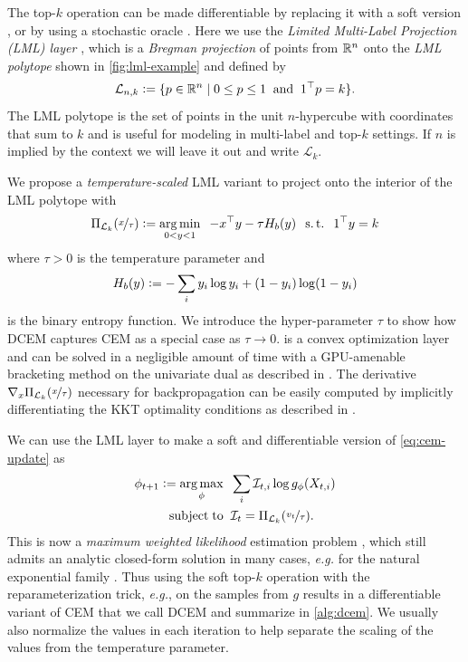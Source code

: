 \documentclass{article}
\newcommand{\eg}{{\it e.g.}\xspace}
\newcommand{\LML}{\ensuremath{\mathcal{L}}}
\begin{document}
The top-$k$ operation can be made differentiable by
replacing it with a soft version
\citep{martins2017learning,malaviya2018sparse,amos2019limited},
or by using a stochastic oracle \citep{brookes2018design}.
Here we use the
\emph{Limited Multi-Label Projection (LML) layer} \citep{amos2019limited},
which is a \emph{Bregman projection} of
points from ${\mathbb{R}}^n$ onto
the \emph{LML polytope}
shown in \cref{fig:lml-example} and defined by
\begin{equation}
  \LML_{n,k} \defeq \{p\in\sR^n \mid 0\leq p\leq 1 \;\;
    {\rm and} \;\; 1^\top p = k\}.
\end{equation}
The LML polytope is the set of points in the unit
$n$-hypercube with coordinates that sum to $k$ and
is useful for modeling in multi-label and top-$k$ settings.
If $n$ is implied by the context we will
leave it out and write $\LML_k$.

We propose a \emph{temperature-scaled} LML variant
to project onto the interior of the LML polytope with
\begin{equation}
  \Pi_{\LML_k}(\nicefrac{x}{\tau}) \defeq \argmin_{0<y<1} \;\; -x^\top y - \tau H_b(y) \;\; \st\;\; 1^\top y = k
  \label{eq:lml-proj}
\end{equation}
where $\tau>0$ is the temperature parameter and
$$H_b(y) \vcentcolon= - \sum_i y_i\log y_i + (1-y_i)\log (1-y_i)$$
is the binary entropy function.
We introduce the hyper-parameter $\tau$ to show how DCEM
captures CEM as a special case as $\tau\rightarrow 0$.
 is a convex optimization layer and
can be solved in a negligible amount of time with a GPU-amenable
bracketing method on the univariate dual as described
in \citet{amos2019limited}.
The derivative $\nabla_x \Pi_{\LML_k}(\nicefrac{x}{\tau})$
necessary for backpropagation can be easily computed by
implicitly differentiating the KKT optimality conditions as
described in \citet{amos2019limited}.

We can use the LML layer to make a soft and differentiable
version of \cref{eq:cem-update} as
\begin{equation}
  \begin{split}
    \phi_{t+1} \defeq \argmax_\phi &\;\; \sum_i \gI_{t,i} \log g_\phi(X_{t,i}) \\
    \subjectto &\;\; \gI_t = \Pi_{\LML_k}(\nicefrac{v_t}{\tau}).
  \end{split}
  \label{eq:cem-update-soft}
\end{equation}
This is now a
\emph{maximum weighted likelihood} estimation problem
\citep{markatou1997weighted,markatou1998weighted,wang2001maximum,hu2002weighted},
which still admits an analytic closed-form solution in
many cases, \eg for the natural exponential family \citep{de2005tutorial}.
Thus using the soft top-$k$ operation with the reparameterization trick, \eg,
on the samples from $g$ results in a differentiable variant of
CEM that we call DCEM and summarize in \cref{alg:dcem}.
We usually also normalize the values in each iteration
to help separate the scaling of the values from the temperature parameter.
\end{document}
